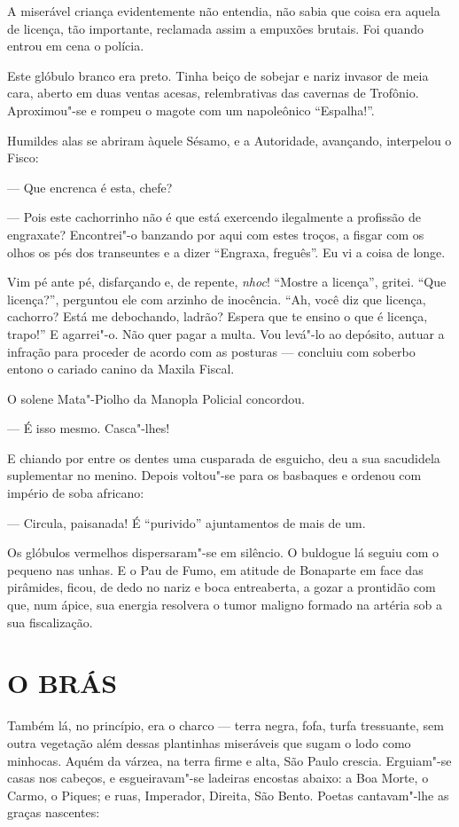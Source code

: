 A miserável criança evidentemente não entendia, não sabia que coisa era
aquela de licença, tão importante, reclamada assim a empuxões brutais.
Foi quando entrou em cena o polícia.

Este glóbulo branco era preto. Tinha beiço de sobejar e nariz invasor de
meia cara, aberto em duas ventas acesas, relembrativas das cavernas de
Trofônio. Aproximou"-se e rompeu o magote com um napoleônico
``Espalha!''.

Humildes alas se abriram àquele Sésamo, e a Autoridade, avançando,
interpelou o Fisco:

--- Que encrenca é esta, chefe?

--- Pois este cachorrinho não é que está exercendo ilegalmente a
profissão de engraxate? Encontrei"-o banzando por aqui com estes troços,
a fisgar com os olhos os pés dos transeuntes e a dizer ``Engraxa,
freguês''. Eu vi a coisa de longe.

Vim pé ante pé, disfarçando e, de repente, \emph{nhoc}! ``Mostre a
licença'', gritei. ``Que licença?'', perguntou ele com arzinho de
inocência. ``Ah, você diz que licença, cachorro? Está me debochando,
ladrão? Espera que te ensino o que é licença, trapo!'' E agarrei"-o. Não
quer pagar a multa. Vou levá"-lo ao depósito, autuar a infração para
proceder de acordo com as posturas --- concluiu com soberbo entono o
cariado canino da Maxila Fiscal.

O solene Mata"-Piolho da Manopla Policial concordou.

--- É isso mesmo. Casca"-lhes!

E chiando por entre os dentes uma cusparada de esguicho, deu a sua
sacudidela suplementar no menino. Depois voltou"-se para os basbaques e
ordenou com império de soba africano:

--- Circula, paisanada! É ``purivido'' ajuntamentos de mais de um.

Os glóbulos vermelhos dispersaram"-se em silêncio. O buldogue lá seguiu
com o pequeno nas unhas. E o Pau de Fumo, em atitude de Bonaparte em
face das pirâmides, ficou, de dedo no nariz e boca entreaberta, a gozar
a prontidão com que, num ápice, sua energia resolvera o tumor maligno
formado na artéria sob a sua fiscalização.

\section*{O BRÁS}

Também lá, no princípio, era o charco --- terra negra, fofa, turfa
tressuante, sem outra vegetação além dessas plantinhas miseráveis que
sugam o lodo como minhocas. Aquém da várzea, na terra firme e alta, São
Paulo crescia. Erguiam"-se casas nos cabeços, e esgueiravam"-se ladeiras
encostas abaixo: a Boa Morte, o Carmo, o Piques; e ruas, Imperador,
Direita, São Bento. Poetas cantavam"-lhe as graças nascentes:

